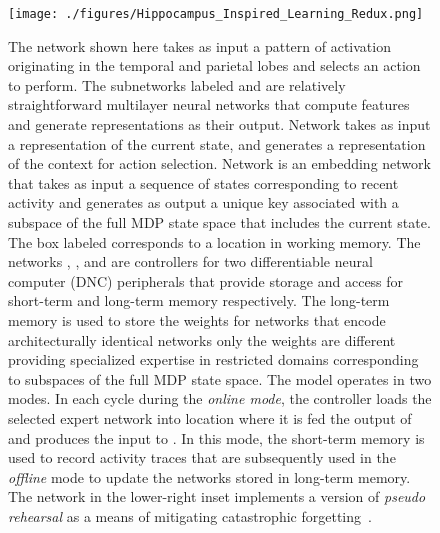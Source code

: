 
\begin{figure}
%
  \begin{center} 
    \texttt{[image: ./figures/Hippocampus\_Inspired\_Learning\_Redux.png]} 
  \end{center}
%
  \caption{The network shown here takes as input a pattern of activation originating in the temporal and parietal lobes and selects an action to perform. The subnetworks labeled  and  are relatively straightforward multilayer neural networks that compute features and generate representations as their output. Network  takes as input a representation of the current state, and generates a representation of the context for action selection. Network  is an embedding network that takes as input a sequence of states corresponding to recent activity and generates as output a unique key associated with a subspace of the full MDP state space that includes the current state. The box labeled  corresponds to a location in working memory. The networks , ,  and  are controllers for two differentiable neural computer (DNC) peripherals that provide storage and access for short-term and long-term memory respectively. The long-term memory is used to store the weights for networks that encode architecturally identical networks {\emdash{}} only the weights are different {\emdash{}} providing specialized expertise in restricted domains corresponding to subspaces of the full MDP state space. The model operates in two modes. In each cycle during the {\it{online mode}}, the  controller loads the selected expert network into location  where it is fed the output of  and produces the input to . In this mode, the short-term memory is used to record activity traces that are subsequently used in the {\it{offline}} mode to update the networks stored in long-term memory. The network in the lower-right inset implements a version of {\it{pseudo rehearsal}} as a means of mitigating catastrophic forgetting~\cite{FrenchTiCS-99}.}
%
  \label{fig_hippo}
%
\end{figure}


